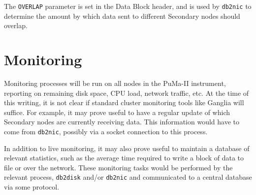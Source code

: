 The {\tt OVERLAP} parameter is set in the Data Block header, and is used
by {\tt db2nic} to determine the amount by which data sent to different
Secondary nodes should overlap.

\section{Monitoring}

Monitoring processes will be run on all nodes in the PuMa-II
instrument, reporting on remaining disk space, CPU load, network
traffic, etc.  At the time of this writing, it is not clear if
standard cluster monitoring tools like Ganglia will suffice.  For
example, it may prove useful to have a regular update of which
Secondary nodes are currently receiving data.  This information would
have to come from {\tt db2nic}, possibly via a socket connection to
this process.

In addition to live monitoring, it may also prove useful to maintain a
database of relevant statistics, such as the average time required to
write a block of data to file or over the network.  These monitoring
tasks would be performed by the relevant process, {\tt db2disk} and/or
{\tt db2nic} and communicated to a central database via some protocol.
